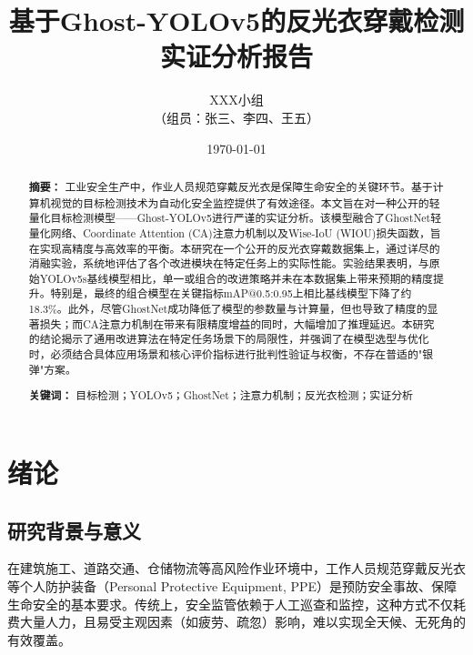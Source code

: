 \documentclass[a4paper]{ctexart}
\begin{document}
\title{\heiti \Huge 基于Ghost-YOLOv5的反光衣穿戴检测实证分析报告}
\author{XXX小组 \\ （组员：张三、李四、王五）}
\date{\today}
\maketitle
\thispagestyle{empty} %
\newpage

\begin{abstract}
    \noindent \textbf{摘要：} 工业安全生产中，作业人员规范穿戴反光衣是保障生命安全的关键环节。基于计算机视觉的目标检测技术为自动化安全监控提供了有效途径。本文旨在对一种公开的轻量化目标检测模型——Ghost-YOLOv5进行严谨的实证分析。该模型融合了GhostNet轻量化网络、Coordinate Attention (CA)注意力机制以及Wise-IoU (WIOU)损失函数，旨在实现高精度与高效率的平衡。本研究在一个公开的反光衣穿戴数据集上，通过详尽的消融实验，系统地评估了各个改进模块在特定任务上的实际性能。实验结果表明，与原始YOLOv5s基线模型相比，单一或组合的改进策略并未在本数据集上带来预期的精度提升。特别是，最终的组合模型在关键指标mAP@0.5:0.95上相比基线模型下降了约18.3\%。此外，尽管GhostNet成功降低了模型的参数量与计算量，但也导致了精度的显著损失；而CA注意力机制在带来有限精度增益的同时，大幅增加了推理延迟。本研究的结论揭示了通用改进算法在特定任务场景下的局限性，并强调了在模型选型与优化时，必须结合具体应用场景和核心评价指标进行批判性验证与权衡，不存在普适的"银弹"方案。
    \vspace{1cm}

    \noindent \textbf{关键词：} 目标检测；YOLOv5；GhostNet；注意力机制；反光衣检测；实证分析
\end{abstract}
\newpage

\tableofcontents
\newpage

\section{绪论}

\subsection{研究背景与意义}
在建筑施工、道路交通、仓储物流等高风险作业环境中，工作人员规范穿戴反光衣等个人防护装备（Personal Protective Equipment, PPE）是预防安全事故、保障生命安全的基本要求。传统上，安全监管依赖于人工巡查和监控，这种方式不仅耗费大量人力，且易受主观因素（如疲劳、疏忽）影响，难以实现全天候、无死角的有效覆盖。
\end{document}
